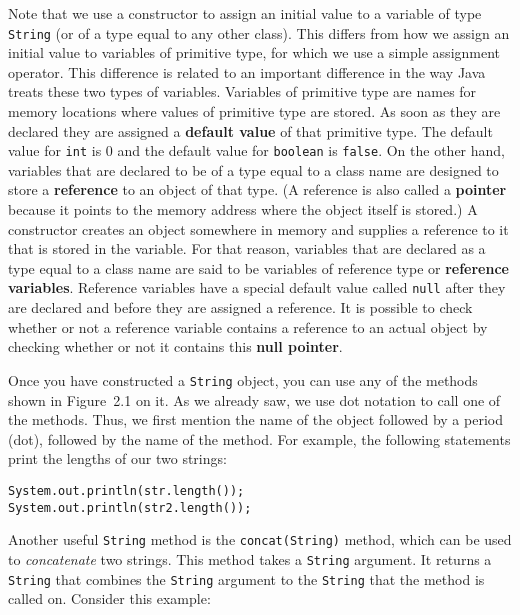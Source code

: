 Note that we use a constructor to assign an initial value to a
variable of type {\tt String} (or of a type equal to any other
class). This differs from how we assign an initial value to variables
of primitive type, for which we use a simple assignment operator.
This difference is related to an important difference in the way Java
treats these two types of variables.  Variables of primitive type are
names for memory locations where values of primitive type are stored.
As soon as they are declared they are assigned a {\bf default value}
of that primitive type.  The default value for {\tt int} is $0$ and
the default value for {\tt boolean} is {\tt false}.  On the other
hand, variables that are declared to be of a type equal to a class
name are designed to store a {\bf reference} to an object of that
type. (A reference is also called a {\bf pointer} because it points to
the memory address where the object itself is stored.) A constructor
creates an object somewhere in memory and supplies a reference to it
that is stored in the variable.  For that reason, variables that are
declared as a type equal to a class name are said to be variables of
reference type or {\bf reference variables}.  Reference variables have
a special default value called {\tt null} after they are declared and
before they are assigned a reference.  It is possible to check whether
or not a reference variable contains a reference to an actual object
by checking whether or not it contains this {\bf null pointer}.

Once you have constructed a {\tt String} object, you can use any of
the methods shown in Figure~2.1 on it. As we already
saw, we use dot notation to call one of the methods. Thus, we first
mention the name of the object followed by a period (dot), followed by
the name of the method. For example, the following statements print
the lengths of our two strings:

\begin{jjjlisting}
\begin{lstlisting}
System.out.println(str.length());
System.out.println(str2.length());
\end{lstlisting}
\end{jjjlisting}

Another useful {\tt String} method is the {\tt concat(String)} method,
which can be used to {\it concatenate} two strings. This method takes
a {\tt String} argument. It returns a {\tt String} that combines the
{\tt String} argument to the {\tt String} that the method is called on.
Consider this example:

